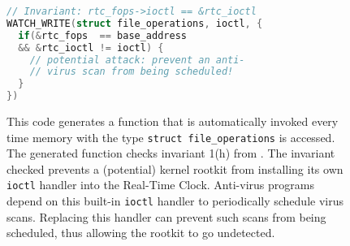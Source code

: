 \documentclass[preprint]{sigplanconf}
\let\ORIGcaption\caption
\begin{document}
\begin{figure}[t]
\begin{lstlisting}[language=C,basicstyle=\footnotesize\ttfamily]
// Invariant: rtc_fops->ioctl == &rtc_ioctl
WATCH_WRITE(struct file_operations, ioctl, {
  if(&rtc_fops  == base_address
  && &rtc_ioctl != ioctl) {
    // potential attack: prevent an anti-
    // virus scan from being scheduled!
  }
})
\end{lstlisting}
\ORIGcaption{\label{fig:field_invariant_check}This code generates a function that is automatically invoked every time memory with the type \texttt{struct file\_operations} is accessed. The generated function checks invariant 1(h) from \cite{GibraltarKernelInvariants}. The invariant checked prevents a (potential) kernel rootkit from installing its own \texttt{ioctl} handler into the Real-Time Clock. Anti-virus programs depend on this built-in \texttt{ioctl} handler to periodically schedule virus scans. Replacing this handler can prevent such scans from being scheduled, thus allowing the rootkit to go undetected.}
\end{figure}







\end{document}
